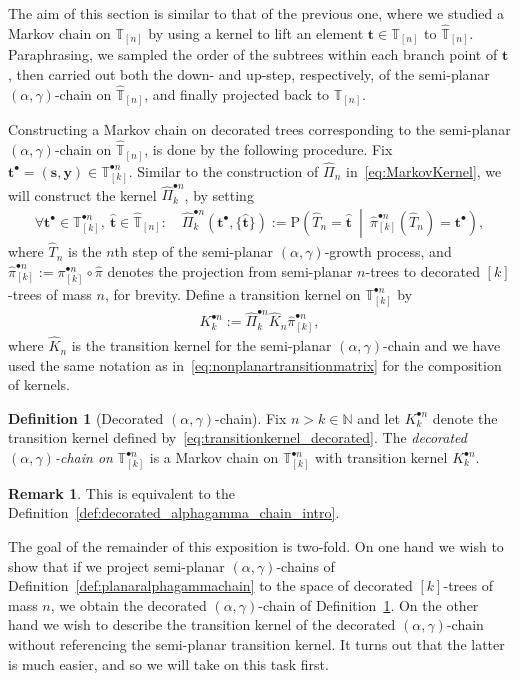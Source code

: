 \documentclass[a4paper, final]{amsart}
\theoremstyle{plain}
\theoremstyle{definition}
\newtheorem{defi}[thm]{Definition}
\newtheorem{rem}[thm]{Remark}
\newcommand{\tree}[1][t]{\boldsymbol{#1}}
\newcommand{\that}[1][t]{\hat{\boldsymbol{#1}}} %
\newcommand{\That}[1][T]{\widehat{#1}}
\newcommand{\Thatspace}[1][\T]{\widehat{\boldsymbol{#1}}} %
\newcommand{\T}{\mathbb{T}}
\renewcommand{\P}{\mathrm{P}}
\newcommand{\N}{\mathbb{N}}
\begin{document}
%
The aim of this section is similar to that of the previous one, where we studied a Markov chain on $\T_{[n]}$ by using a kernel to lift an element $\tree \in \T_{[n]}$ to $\Thatspace_{[n]}$.
Paraphrasing, we sampled the order of the subtrees within each branch point of $\tree$, then carried out both the down- and up-step, respectively, of the semi-planar $(\alpha, \gamma)$-chain on $\Thatspace_{[n]}$, and finally projected back to $\T_{[n]}$.

Constructing a Markov chain on decorated trees corresponding to the semi-planar $(\alpha, \gamma)$-chain on $\Thatspace_{[n]}$, is done by the following procedure.
Fix $\tree^\bullet = (\tree[s], \mathbf{y}) \in \T_{[k]}^{\bullet n}$.
Similar to the construction of ${\hat{\Pi}}_n$ in~\eqref{eq:MarkovKernel}, we will construct the kernel ${\hat{\Pi}}_k^{\bullet n}$, by setting
\begin{align}
  \forall \tree^\bullet \in \T_{[k]}^{\bullet n}, \ \that \in \Thatspace_{[n]} \colon \quad
  {\hat{\Pi}}_k^{\bullet n} (\tree^\bullet, \{\that\}) :=
  \P \left( \That_n = \that \ \middle \vert \ \hat{\pi}_{[k]}^{\bullet n} \left(\That_n\right) = \tree^\bullet \right),
  \label{eq:decoratedkernel}
\end{align}
where $\That_n$ is the $n$th step of the semi-planar $(\alpha, \gamma)$-growth process, and $\hat{\pi}_{[k]}^{\bullet n} := \pi_{[k]}^{\bullet n} \circ \hat{\pi}$ denotes the  projection from semi-planar $n$-trees to decorated $[k]$-trees of mass $n$, for brevity.
Define a transition kernel on $\T_{[k]}^{\bullet n}$ by 
%
\begin{align}
  K_k^{\bullet n} := {\hat{\Pi}}_k^{\bullet n} \hat{K}_n \hat{\pi}_{[k]}^{\bullet n},
  \label{eq:transitionkernel_decorated}
\end{align}
%
where $\hat{K}_n$ is the transition kernel for the semi-planar $(\alpha, \gamma)$-chain and we have used the same notation as in~\eqref{eq:nonplanartransitionmatrix} for the composition of kernels.
%
\begin{defi}[Decorated $(\alpha, \gamma)$-chain]\label{def:decorated_alphagamma_chain}
  Fix $n > k \in \N$ and let $K_k^{\bullet n}$ denote the transition kernel defined by~\eqref{eq:transitionkernel_decorated}.
The \textit{decorated $(\alpha, \gamma)$-chain on} $\T_{[k]}^{\bullet n}$ is a Markov chain on $\T_{[k]}^{\bullet n}$ with transition kernel $K_k^{\bullet n}$.
\end{defi}
%
\begin{rem}
  This is equivalent to the Definition~\ref{def:decorated_alphagamma_chain_intro}.
\end{rem}
%
The goal of the remainder of this exposition is two-fold.
On one hand we wish to show that if we project semi-planar $(\alpha, \gamma)$-chains of Definition~\ref{def:planaralphagammachain} to the space of decorated $[k]$-trees of mass $n$, we obtain the decorated $(\alpha, \gamma)$-chain of Definition~\ref{def:decorated_alphagamma_chain}.
On the other hand we wish to describe the transition kernel of the decorated $(\alpha, \gamma)$-chain without referencing the semi-planar transition kernel.
It turns out that the latter is much easier, and so we will take on this task first. 
\end{document}
